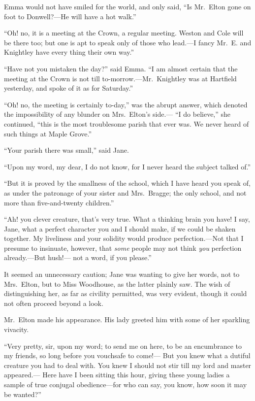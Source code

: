 Emma would not have smiled for the world, and only said, ``Is Mr.\ Elton
gone on foot to Donwell?---He will have a hot walk.''

``Oh! no, it is a meeting at the Crown, a regular meeting.
Weston and Cole will be there too; but one is apt to speak only
of those who lead.---I fancy Mr.\ E. and Knightley have every thing
their own way.''

``Have not you mistaken the day?'' said Emma.  ``I am almost certain
that the meeting at the Crown is not till to-morrow.---Mr.\ Knightley
was at Hartfield yesterday, and spoke of it as for Saturday.''

``Oh! no, the meeting is certainly to-day,'' was the abrupt answer,
which denoted the impossibility of any blunder on Mrs.\ Elton's side.---%
``I do believe,'' she continued, ``this is the most troublesome parish
that ever was.  We never heard of such things at Maple Grove.''

``Your parish there was small,'' said Jane.

``Upon my word, my dear, I do not know, for I never heard the subject
talked of.''

``But it is proved by the smallness of the school, which I have heard
you speak of, as under the patronage of your sister and Mrs.\ Bragge;
the only school, and not more than five-and-twenty children.''

``Ah! you clever creature, that's very true.  What a thinking brain
you have!  I say, Jane, what a perfect character you and I should make,
if we could be shaken together.  My liveliness and your solidity
would produce perfection.---Not that I presume to insinuate, however,
that \emph{some} people may not think \emph{you} perfection already.---But hush!---%
not a word, if you please.''

It seemed an unnecessary caution; Jane was wanting to give her words,
not to Mrs.\ Elton, but to Miss Woodhouse, as the latter plainly saw.
The wish of distinguishing her, as far as civility permitted,
was very evident, though it could not often proceed beyond a look.

Mr.\ Elton made his appearance.  His lady greeted him with some
of her sparkling vivacity.

``Very pretty, sir, upon my word; to send me on here, to be an
encumbrance to my friends, so long before you vouchsafe to come!---%
But you knew what a dutiful creature you had to deal with.
You knew I should not stir till my lord and master appeared.---%
Here have I been sitting this hour, giving these young ladies
a sample of true conjugal obedience---for who can say, you know,
how soon it may be wanted?''

